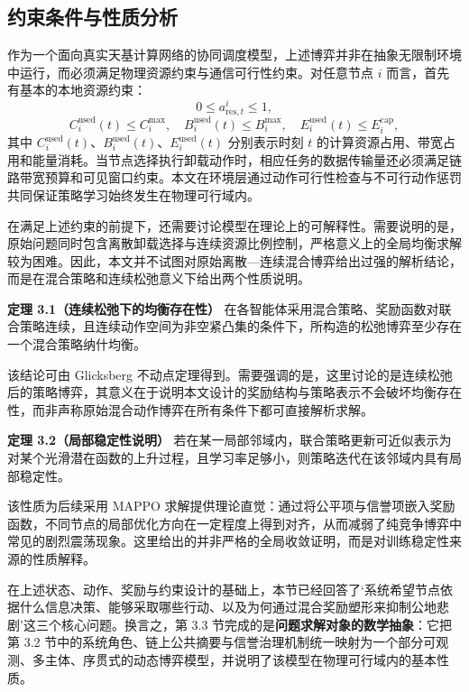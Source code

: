 \subsection{约束条件与性质分析}

作为一个面向真实天基计算网络的协同调度模型，上述博弈并非在抽象无限制环境中运行，而必须满足物理资源约束与通信可行性约束。对任意节点 $i$ 而言，首先有基本的本地资源约束：
\begin{equation}
  0 \le a_{\mathrm{res},t}^i \le 1,
  \label{eq:res_ratio}
\end{equation}
\begin{equation}
  C_i^{\mathrm{used}}(t)\le C_i^{\max},\quad
  B_i^{\mathrm{used}}(t)\le B_i^{\max},\quad
  E_i^{\mathrm{used}}(t)\le E_i^{\mathrm{cap}},
  \label{eq:resource_const}
\end{equation}
其中 $C_i^{\mathrm{used}}(t)$、$B_i^{\mathrm{used}}(t)$、$E_i^{\mathrm{used}}(t)$ 分别表示时刻 $t$ 的计算资源占用、带宽占用和能量消耗。当节点选择执行卸载动作时，相应任务的数据传输量还必须满足链路带宽预算和可见窗口约束。本文在环境层通过动作可行性检查与不可行动作惩罚共同保证策略学习始终发生在物理可行域内。

在满足上述约束的前提下，还需要讨论模型在理论上的可解释性。需要说明的是，原始问题同时包含离散卸载选择与连续资源比例控制，严格意义上的全局均衡求解较为困难。因此，本文并不试图对原始离散—连续混合博弈给出过强的解析结论，而是在混合策略和连续松弛意义下给出两个性质说明。

\textbf{定理 3.1（连续松弛下的均衡存在性）} 在各智能体采用混合策略、奖励函数对联合策略连续，且连续动作空间为非空紧凸集的条件下，所构造的松弛博弈至少存在一个混合策略纳什均衡\cite{ref7}。

该结论可由 Glicksberg 不动点定理得到。需要强调的是，这里讨论的是连续松弛后的策略博弈，其意义在于说明本文设计的奖励结构与策略表示不会破坏均衡存在性，而非声称原始混合动作博弈在所有条件下都可直接解析求解。

\textbf{定理 3.2（局部稳定性说明）} 若在某一局部邻域内，联合策略更新可近似表示为对某个光滑潜在函数的上升过程，且学习率足够小，则策略迭代在该邻域内具有局部稳定性。

该性质为后续采用 MAPPO 求解提供理论直觉：通过将公平项与信誉项嵌入奖励函数，不同节点的局部优化方向在一定程度上得到对齐，从而减弱了纯竞争博弈中常见的剧烈震荡现象。这里给出的并非严格的全局收敛证明，而是对训练稳定性来源的性质解释。


在上述状态、动作、奖励与约束设计的基础上，本节已经回答了‘系统希望节点依据什么信息决策、能够采取哪些行动、以及为何通过混合奖励塑形来抑制公地悲剧’这三个核心问题。换言之，第 3.3 节完成的是\textbf{问题求解对象的数学抽象}：它把第 3.2 节中的系统角色、链上公共摘要与信誉治理机制统一映射为一个部分可观测、多主体、序贯式的动态博弈模型，并说明了该模型在物理可行域内的基本性质。

